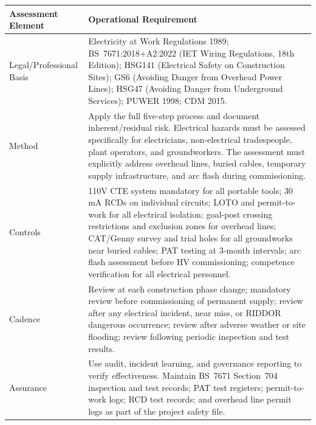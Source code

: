 \begin{table}[H]
\centering
\begin{tabularx}{\textwidth}{>{\raggedright\arraybackslash}p{3.2cm}X}
\toprule
\textbf{Assessment Element} & \textbf{Operational Requirement} \\
\midrule
Legal/Professional Basis & Electricity at Work Regulations 1989; BS~7671:2018+A2:2022 (IET Wiring Regulations, 18th Edition); HSG141 (Electrical Safety on Construction Sites); GS6 (Avoiding Danger from Overhead Power Lines); HSG47 (Avoiding Danger from Underground Services); PUWER 1998; CDM 2015. \\
Method & Apply the full five-step process and document inherent/residual risk. Electrical hazards must be assessed specifically for electricians, non-electrical tradespeople, plant operators, and groundworkers. The assessment must explicitly address overhead lines, buried cables, temporary supply infrastructure, and arc flash during commissioning. \\
Controls & 110V CTE system mandatory for all portable tools; 30\,mA RCDs on individual circuits; LOTO and permit-to-work for all electrical isolation; goal-post crossing restrictions and exclusion zones for overhead lines; CAT/Genny survey and trial holes for all groundworks near buried cables; PAT testing at 3-month intervals; arc flash assessment before HV commissioning; competence verification for all electrical personnel. \\
Cadence & Review at each construction phase change; mandatory review before commissioning of permanent supply; review after any electrical incident, near miss, or RIDDOR dangerous occurrence; review after adverse weather or site flooding; review following periodic inspection and test results. \\
Assurance & Use audit, incident learning, and governance reporting to verify effectiveness. Maintain BS~7671 Section~704 inspection and test records; PAT test registers; permit-to-work logs; RCD test records; and overhead line permit logs as part of the project safety file. \\
\bottomrule
\end{tabularx}
\end{table}


